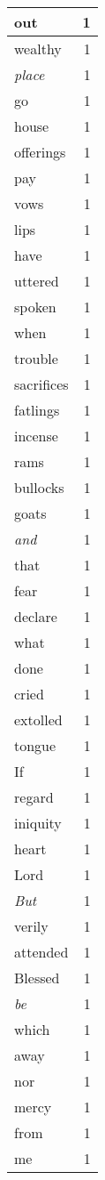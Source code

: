 \begin{center}
\begin{longtable}{l|r}
out & 1 \\ \hline
wealthy & 1 \\ \hline
\emph{place} & 1 \\ \hline
go & 1 \\ \hline
house & 1 \\ \hline
offerings & 1 \\ \hline
pay & 1 \\ \hline
vows & 1 \\ \hline
lips & 1 \\ \hline
have & 1 \\ \hline
uttered & 1 \\ \hline
spoken & 1 \\ \hline
when & 1 \\ \hline
trouble & 1 \\ \hline
sacrifices & 1 \\ \hline
fatlings & 1 \\ \hline
incense & 1 \\ \hline
rams & 1 \\ \hline
bullocks & 1 \\ \hline
goats & 1 \\ \hline
\emph{and} & 1 \\ \hline
that & 1 \\ \hline
fear & 1 \\ \hline
declare & 1 \\ \hline
what & 1 \\ \hline
done & 1 \\ \hline
cried & 1 \\ \hline
extolled & 1 \\ \hline
tongue & 1 \\ \hline
If & 1 \\ \hline
regard & 1 \\ \hline
iniquity & 1 \\ \hline
heart & 1 \\ \hline
Lord & 1 \\ \hline
\emph{But} & 1 \\ \hline
verily & 1 \\ \hline
attended & 1 \\ \hline
Blessed & 1 \\ \hline
\emph{be} & 1 \\ \hline
which & 1 \\ \hline
away & 1 \\ \hline
nor & 1 \\ \hline
mercy & 1 \\ \hline
from & 1 \\ \hline
me & 1 \\ \hline
\end{longtable}
\end{center}




